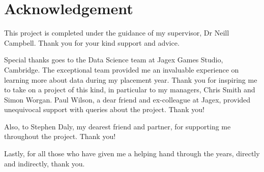 \chapter*{Acknowledgement}
This project is completed under the guidance of my supervisor, Dr Neill Campbell. Thank you for your kind support and advice.

Special thanks goes to the Data Science team at Jagex Games Studio, Cambridge. The exceptional team provided me an invaluable experience on learning more about data during my placement year. Thank you for inspiring me to take on a project of this kind, in particular to my managers, Chris Smith and Simon Worgan. Paul Wilson, a dear friend and ex-colleague at Jagex, provided unequivocal support with queries about the project. Thank you! 

Also, to Stephen Daly, my dearest friend and partner, for supporting me throughout the project. Thank you!

Lastly, for all those who have given me a helping hand through the years, directly and indirectly, thank you.
